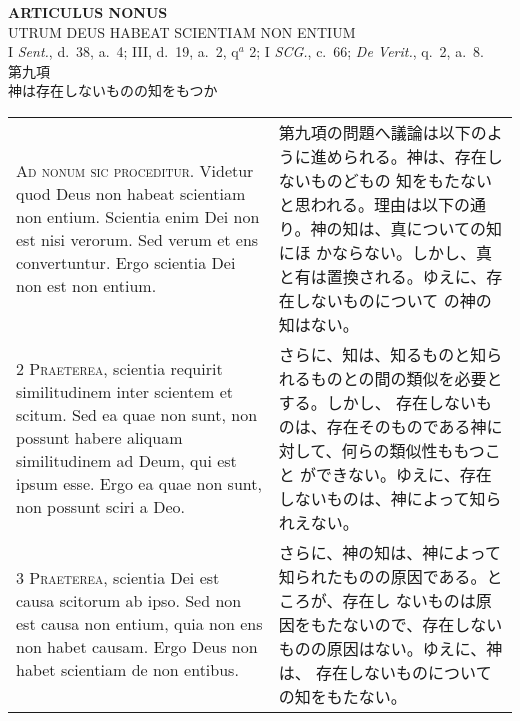 \documentclass[10pt]{jsarticle} %
\begin{document}
\newpage



\begin{center}
 {\Large {\bf ARTICULUS NONUS}}\\
 {\large UTRUM DEUS HABEAT SCIENTIAM NON ENTIUM}\\
 {\footnotesize I {\itshape Sent.}, d.~38, a.~4; III, d.~19, a.~2, q$^a$
 2; I {\itshape SCG.}, c.~66; {\itshape De Verit.}, q.~2, a.~8.}\\
 {\Large 第九項\\神は存在しないものの知をもつか}
\end{center}

\begin{longtable}{p{21em}p{21em}}


{\huge A}{\scshape d nonum sic proceditur}. Videtur quod Deus non
habeat scientiam non entium. Scientia enim Dei non est nisi
verorum. Sed verum et ens convertuntur. Ergo scientia Dei non est non
entium.

&

第九項の問題へ議論は以下のように進められる。神は、存在しないものどもの
知をもたないと思われる。理由は以下の通り。神の知は、真についての知にほ
かならない。しかし、真と有は置換される。ゆえに、存在しないものについて
の神の知はない。

\\



{\scshape 2 Praeterea}, scientia requirit similitudinem
 inter scientem et scitum. Sed ea quae non sunt, non possunt habere
 aliquam similitudinem ad Deum, qui est ipsum esse. Ergo ea quae non
 sunt, non possunt sciri a Deo.

&

さらに、知は、知るものと知られるものとの間の類似を必要とする。しかし、
存在しないものは、存在そのものである神に対して、何らの類似性ももつこと
ができない。ゆえに、存在しないものは、神によって知られえない。

\\



{\scshape 3 Praeterea}, scientia Dei est causa scitorum
 ab ipso. Sed non est causa non entium, quia non ens non habet
 causam. Ergo Deus non habet scientiam de non entibus.

&

さらに、神の知は、神によって知られたものの原因である。ところが、存在し
ないものは原因をもたないので、存在しないものの原因はない。ゆえに、神は、
存在しないものについての知をもたない。


\end{longtable}
\end{document}
